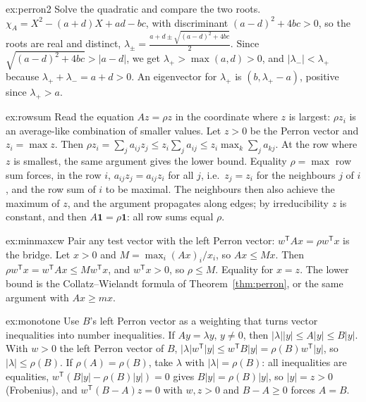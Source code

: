 \begin{solution}{ex:perron2}
\idea Solve the quadratic and compare the two roots.
\writeup $\chi_A=X^2-(a+d)X+ad-bc$, with discriminant $(a-d)^2+4bc>0$, so the roots are real and distinct,
$\lambda_\pm=\frac{a+d\pm\sqrt{(a-d)^2+4bc}}2$. Since $\sqrt{(a-d)^2+4bc}>|a-d|$, we get $\lambda_+>\max(a,d)>0$, and
$|\lambda_-|<\lambda_+$ because $\lambda_++\lambda_-=a+d>0$. An eigenvector for $\lambda_+$ is $(b,\lambda_+-a)$, positive since
$\lambda_+>a$.
\end{solution}

\begin{solution}{ex:rowsum}
\idea Read the equation $Az=\rho z$ in the coordinate where $z$ is largest: $\rho z_i$ is an average-like combination of
smaller values.
\writeup Let $z>0$ be the Perron vector and $z_i=\max z$. Then $\rho z_i=\sum_ja_{ij}z_j\le z_i\sum_ja_{ij}\le z_i\max_k\sum_j
a_{kj}$. At the row where $z$ is smallest, the same argument gives the lower bound. Equality $\rho=\max$ row sum forces, in the
row $i$, $a_{ij}z_j=a_{ij}z_i$ for all $j$, i.e.\ $z_j=z_i$ for the neighbours $j$ of $i$, and the row sum of $i$ to be maximal.
The neighbours then also achieve the maximum of $z$, and the argument propagates along edges; by irreducibility $z$ is constant,
and then $A\mathbf 1=\rho\mathbf 1$: all row sums equal $\rho$.
\end{solution}

\begin{solution}{ex:minmaxcw}
\idea Pair any test vector with the left Perron vector: $w^{\mathsf T}Ax=\rho w^{\mathsf T}x$ is the bridge.
\writeup Let $x>0$ and $M=\max_i(Ax)_i/x_i$, so $Ax\le Mx$. Then $\rho w^{\mathsf T}x=w^{\mathsf T}Ax\le Mw^{\mathsf T}x$, and
$w^{\mathsf T}x>0$, so $\rho\le M$. Equality for $x=z$. The lower bound is the Collatz--Wielandt formula of
Theorem~\ref{thm:perron}, or the same argument with $Ax\ge mx$.
\end{solution}

\begin{solution}{ex:monotone}
\idea Use $B$'s left Perron vector as a weighting that turns vector inequalities into number inequalities.
\writeup If $Ay=\lambda y$, $y\ne0$, then $|\lambda||y|\le A|y|\le B|y|$. With $w>0$ the left Perron vector of $B$,
$|\lambda|w^{\mathsf T}|y|\le w^{\mathsf T}B|y|=\rho(B)w^{\mathsf T}|y|$, so $|\lambda|\le\rho(B)$. If $\rho(A)=\rho(B)$, take
$\lambda$ with $|\lambda|=\rho(B)$: all inequalities are equalities, $w^{\mathsf T}(B|y|-\rho(B)|y|)=0$ gives $B|y|=\rho(B)|y|$, so
$|y|=z>0$ (Frobenius), and $w^{\mathsf T}(B-A)z=0$ with $w,z>0$ and $B-A\ge0$ forces $A=B$.
\end{solution}

